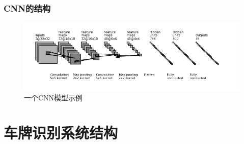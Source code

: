 \documentclass[UTF8]{beamer}
\begin{document}
\begin{frame}
  \frametitle{CNN的结构}

  \begin{figure}[ht]
    \includegraphics[width=1.0\linewidth]{./Figure/RecognitionAlnum.png}
    \caption{一个CNN模型示例}
  \end{figure}
\end{frame}
  
\section{车牌识别系统结构}
\end{document}
